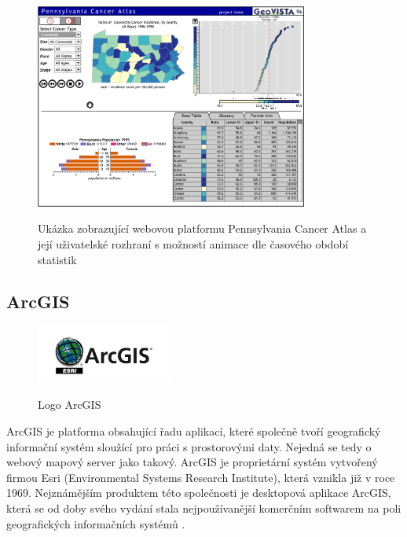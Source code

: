 \begin{figure}[h!]  \centering
\includegraphics[width=0.8\textwidth]{../img/pennsylvania-cancer-atlas.png}
	\caption{Ukázka zobrazující webovou platformu Pennsylvania
Cancer Atlas a její uživatelské rozhraní s možností animace dle
časového období statistik}
	\cite{cancer-atlas}
	\label{fig:cancer-atlas}
\end{figure}
 
\newpage
\subsection{ArcGIS}

\begin{figure}[h!]  \centering
\includegraphics[width=0.4\textwidth]{../img/arcgis-logo.jpg}
	\caption{Logo ArcGIS}
	\cite{arcgis-logo}
	\label{fig:arcgis-logo}
\end{figure} \bigskip

ArcGIS je platforma obsahující řadu aplikací, které společně tvoří
geografický informační systém sloužící pro práci s prostorovými
daty. Nejedná se tedy o webový mapový server jako takový. ArcGIS je
proprietární systém vytvořený firmou Esri (Environmental Systems Research
Institute), která vznikla již v roce 1969. Nejznámějším produktem této společnosti je desktopová aplikace ArcGIS, která
se od doby svého vydání stala nejpoužívanější komerčním softwarem na poli geografických informačních systémů \cite{arcgis-wiki}.

